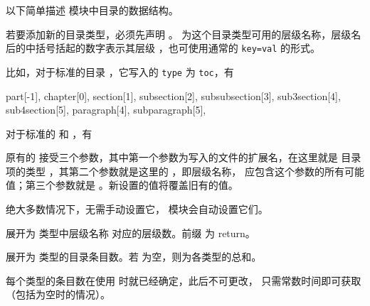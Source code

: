 \documentclass{whudoc}
\begin{document}
以下简单描述  模块中目录的数据结构。

\begin{function}{\addcombinedlisttype}
  \begin{syntax}
    \V\addcombinedlisttype {} 
  \end{syntax}
若要添加新的目录类型，必须先声明 。 为这个目录类型可用的层级名称，层级名后的中括号括起的数字表示其层级 ，也可使用通常的 \texttt{key=val} 的形式。
\end{function}

比如，对于标准的目录 ，它写入的 \texttt{type} 为 \texttt{toc}，有
\begin{xample}
  { 
    part[-1], 
    chapter[0], 
    section[1], subsection[2], subsubsection[3], 
    sub3section[4], sub4section[5], 
    paragraph[4], subparagraph[5], 
  }
\stopxamplecode
\xamplecode \medskip
\end{xample}

对于标准的  和 ，有
\begin{xample}
\stopxamplecode 
\xamplecode \medskip
\end{xample}

原有的  接受三个参数，其中第一个参数为写入的文件的扩展名，在这里就是
目录项的类型 ，其第二个参数就是这里的 ，即层级名称， 应包含这个参数的所有可能值；第三个参数就是 。新设置的值将覆盖旧有的值。

绝大多数情况下，无需手动设置它， 模块会自动设置它们。

\begin{function}[EXP]{\retcbltypelevel}
  \begin{syntax}
    \V\retcbltypelevel {} 
  \end{syntax}
展开为  类型中层级名称  对应的层级数。前缀  为 return。
\end{function}

\begin{function}[EXP]{\retcbltotalcounts}
  \begin{syntax}
    \V\retcbltotalcounts {}
  \end{syntax}
展开为  类型的目录条目数。若  为空，则为各类型的总和。

每个类型的条目数在使用  时就已经确定，此后不可更改，
只需常数时间即可获取（包括为空时的情况）。
\end{function}
\end{document}
